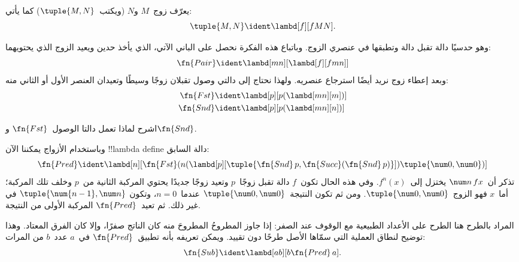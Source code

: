 \documentclass[../../../include/open-logic-section]{subfiles}
\begin{document}

\begin{defn}
يعرّف زوج~$M$ و$N$ (ويكتب~$\tuple{M,N}$) كما يأتي:
\[
\tuple{M,N} \ident \lambd[f][fMN].
\]
\end{defn}
  
وهو حدسيًا دالة تقبل دالة وتطبقها في عنصري الزوج. وباتباع هذه الفكرة
نحصل على الباني الآتي، الذي يأخذ حدين ويعيد الزوج الذي يحتويهما:
\[
  \fn{Pair} \ident \lambd[mn][\lambd[f][fmn]]
\]
وبعد إعطاء زوج نريد أيضًا استرجاع عنصريه. ولهذا نحتاج إلى دالتي وصول
تقبلان زوجًا وسيطًا وتعيدان العنصر الأول أو الثاني منه:
\begin{align*}
  \fn{Fst} & \ident \lambd[p][p(\lambd[mn][m])]\\
  \fn{Snd} & \ident \lambd[p][p(\lambd[mn][n])]
\end{align*}

\begin{prob}
  اشرح لماذا تعمل دالتا الوصول~$\fn{Fst}$ و$\fn{Snd}$.
\end{prob}

وباستخدام الأزواج يمكننا الآن !!{lambda define} دالة السابق:
\[
  \fn{Pred} \ident \lambd[n][\fn{Fst}(n (\lambd[p][\tuple{\fn{Snd}\, {p}, \fn{Succ}(\fn{Snd}\, {p})}]) \tuple{\num 0, \num 0})]
\]
تذكر أن~$\num n\, f x$ يختزل إلى~$f^{n}(x)$. وفي هذه الحال تكون~$f$
دالة تقبل زوجًا~$p$ وتعيد زوجًا جديدًا يحتوي المركبة الثانية من~$p$
وخلف تلك المركبة؛ أما~$x$ فهو الزوج~$\tuple{\num 0,\num 0}$. ومن ثم
تكون النتيجة~$\tuple{\num 0,\num 0}$ عندما~$n=0$، وتكون
$\tuple{\num{n-1}, \num n}$ في غير ذلك. ثم تعيد~$\fn{Pred}$ المركبة
الأولى من النتيجة.

المراد بالطرح هنا الطرح على الأعداد الطبيعية مع الوقوف عند الصفر:
إذا جاوز المطروحُ المطروحَ منه كان الناتج صفرًا، وإلا كان الفرق المعتاد.
وهذا توضيح لنطاق العملية التي سمّاها الأصل طرحًا دون تقييد.
ويمكن تعريفه بأنه تطبيق~$\fn{Pred}$ في~$a$ عدد~$b$ من المرات:
\[
\fn{Sub} \ident \lambd[ab][b \fn{Pred}\, a].
\]
    
\end{document}
